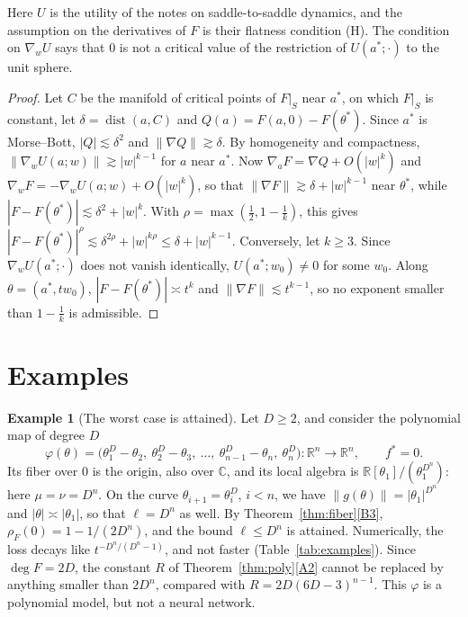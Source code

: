 \documentclass[11pt]{article}
\theoremstyle{definition}
\newtheorem{example}[lemma]{Example}
\theoremstyle{remark}
\newcommand{\R}{\mathbb{R}}
\newcommand{\C}{\mathbb{C}}
\DeclareMathOperator{\dist}{dist}
\begin{document}
Here $U$ is the utility of the notes on saddle-to-saddle dynamics, and the assumption on the derivatives of $F$ is their flatness condition (H). The condition on $\nabla_wU$ says that $0$ is not a critical value of the restriction of $U(a^*;\cdot)$ to the unit sphere.

\begin{proof}
Let $C$ be the manifold of critical points of $F|_S$ near $a^*$, on which $F|_S$ is constant, let $\delta=\dist(a,C)$ and $Q(a)=F(a,0)-F(\theta^*)$. Since $a^*$ is Morse--Bott, $|Q|\lesssim\delta^2$ and $\|\nabla Q\|\gtrsim\delta$. By homogeneity and compactness, $\|\nabla_wU(a;w)\|\gtrsim|w|^{k-1}$ for $a$ near $a^*$. Now $\nabla_aF=\nabla Q+O(|w|^k)$ and $\nabla_wF=-\nabla_wU(a;w)+O(|w|^k)$, so that $\|\nabla F\|\gtrsim\delta+|w|^{k-1}$ near $\theta^*$, while $|F-F(\theta^*)|\lesssim\delta^2+|w|^k$. With $\rho=\max(\frac12,1-\frac1k)$, this gives $|F-F(\theta^*)|^\rho\lesssim\delta^{2\rho}+|w|^{k\rho}\le\delta+|w|^{k-1}$. Conversely, let $k\ge3$. Since $\nabla_wU(a^*;\cdot)$ does not vanish identically, $U(a^*;w_0)\ne0$ for some $w_0$. Along $\theta=(a^*,tw_0)$, $|F-F(\theta^*)|\asymp t^k$ and $\|\nabla F\|\lesssim t^{k-1}$, so no exponent smaller than $1-\frac1k$ is admissible.
\end{proof}

\section{Examples}\label{sec:examples}

\begin{example}[The worst case is attained]\label{ex:chain}
Let $D\ge2$, and consider the polynomial map of degree $D$
\[
\varphi(\theta)=\big(\theta_1^D-\theta_2,\ \theta_2^D-\theta_3,\ \dots,\ \theta_{n-1}^D-\theta_n,\ \theta_n^D\big)\colon\R^n\to\R^n,\qquad f^*=0 .
\]
Its fiber over $0$ is the origin, also over $\C$, and its local algebra is $\R[\theta_1]/(\theta_1^{D^n})$: here $\mu=\nu=D^n$. On the curve $\theta_{i+1}=\theta_i^D$, $i<n$, we have $\|g(\theta)\|=|\theta_1|^{D^n}$ and $|\theta|\asymp|\theta_1|$, so that $\ell=D^n$ as well. By Theorem~\ref{thm:fiber}\ref{B3}, $\rho_F(0)=1-1/(2D^n)$, and the bound $\ell\le D^n$ is attained. Numerically, the loss decays like $t^{-D^n/(D^n-1)}$, and not faster (Table~\ref{tab:examples}). Since $\deg F=2D$, the constant $R$ of Theorem~\ref{thm:poly}\ref{A2} cannot be replaced by anything smaller than $2D^n$, compared with $R=2D(6D-3)^{n-1}$. This $\varphi$ is a polynomial model, but not a neural network.
\end{example}
\end{document}
